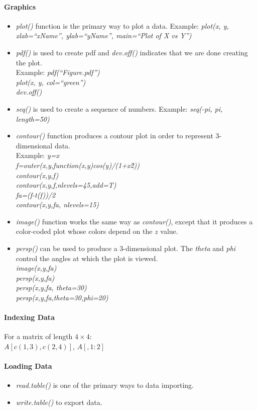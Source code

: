  \paragraph{Graphics}
 \begin{itemize}
   \item \emph{plot()} function is the primary way to plot a data.
     Example: \textit{plot(x, y, xlab=``xName'', ylab=``yName'',
     main=``Plot of X vs Y'')}
   \item \emph{pdf()} is used to create pdf and \emph{dev.off()}
     indicates that we are done creating the plot.\\Example:\textit{
     pdf(``Figure.pdf'')\\plot(x, y, col=``green'')\\dev.off()}
   \item \emph{seq()} is used to create a sequence of numbers.
     Example: \textit{seq(-pi, pi, length=50)}
   \item \emph{contour()} function produces a contour plot in order to
     represent 3-dimensional data.\\Example: \textit{y=x\\
     f=outer(x,y,function(x,y)cos(y)/(1+x\^ 2))\\contour(x,y,f)\\
   contour(x,y,f,nlevels=45,add=T)\\fa=(f-t(f))/2\\contour(x,y,fa,
 nlevels=15)}
 \item \emph{image()} function works the same way as \emph{contour()},
   except that it produces a color-coded plot whose colors depend on
   the $z$ value.
 \item \emph{persp()} can be used to produce a 3-dimensional plot. The
   \emph{theta} and \emph{phi} control the angles at which the plot is
   viewed.\\\textit{image(x,y,fa)\\persp(x,y,fa)\\persp(x,y,fa,
   theta=30)\\persp(x,y,fa,theta=30,phi=20)}
 \end{itemize}
 \paragraph{Indexing Data}
 For a matrix of length $4\times 4$:\\
 $A[c(1,3),c(2,4)]$, $A[,1:2]$
 \paragraph{Loading Data}
 \begin{itemize}
   \item \emph{read.table()} is one of the primary ways to data
     importing.
   \item \emph{write.table()} to export data.
 \end{itemize}
